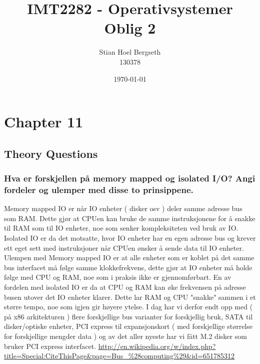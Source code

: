 \documentclass[11pt]{article}
\title{IMT2282 - Operativsystemer \\
	Oblig 2}
\author{Stian Hoel Bergseth \\
	130378}
\date{\today}
\begin{document}
\maketitle

\section{Chapter 11}
\subsection{Theory Questions}
\setcounter{subsection}{6}
\subsubsection{Hva er forskjellen på memory mapped og isolated I/O? Angi fordeler og ulemper med disse to prinsippene.}

Memory mapped IO er når IO enheter ( disker osv ) deler samme adresse bus som RAM. Dette gjør at CPUen kan bruke de samme instruksjonene for å snakke til RAM som til IO enheter, noe som senker kompleksiteten ved bruk av IO. Isolated IO er da det motsatte, hvor IO enheter har en egen adresse bus og krever ett eget sett med instruksjoner når CPUen ønsker å sende data til IO enheter. Ulempen med Memory mapped IO er at alle enheter som er koblet på det samme bus interfacet må følge samme klokkefrekvens, dette gjør at IO enheter må holde følge med CPU og RAM, noe som i praksis ikke er gjennomførbart. En av fordelen med isolated IO er da at CPU og RAM kan øke frekvensen på adresse busen utover det IO enheter klarer. Dette lar RAM og CPU "snakke" sammen i et større tempo, noe som igjen gir høyere ytelse. 
I dag har vi derfor endt opp med ( på x86 arkitekturen ) flere forskjellige bus varianter for forskjellig bruk, SATA til disker/optiske enheter, PCI express til expansjonskort ( med forskjellige størrelse for forskjellige mengder data ) og av det aller nyeste har vi fått M.2 disker som bruker PCI express interfacet.  \url{http://en.wikipedia.org/w/index.php?title=Special:CiteThisPage&page=Bus_%28computing%29&id=651785312}
\end{document}

